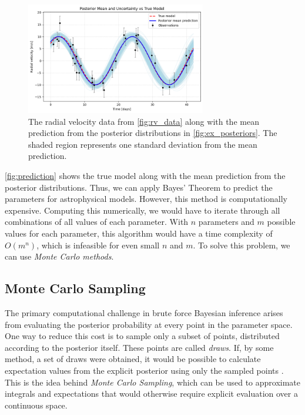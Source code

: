 \documentclass[preprint,longauthor]{aastex631}
\numberwithin{equation}{section}
\begin{document}
\begin{figure}[ht!]
\centering
\includegraphics[width=0.7\textwidth]{../scripts/2.2/figures/prediction.png}
\caption{The radial velocity data from \autoref{fig:rv_data} along with the mean prediction from the posterior distributions in \autoref{fig:ex_posteriors}. The shaded region represents one standard deviation from the mean prediction.}
\label{fig:prediction}
\end{figure}

\autoref{fig:prediction} shows the true model along with the mean prediction from the posterior distributions. Thus, we can apply Bayes' Theorem to predict the parameters for astrophysical models. However, this method is computationally expensive. Computing this numerically, we would have to iterate through all combinations of all values of each parameter. With $n$ parameters and $m$ possible values for each parameter, this algorithm would have a time complexity of $O(m^n)$, which is infeasible for even small $n$ and $m$. To solve this problem, we can use \textit{Monte Carlo methods}.

\subsection{Monte Carlo Sampling}
The primary computational challenge in brute force Bayesian inference arises from evaluating the posterior probability at every point in the parameter space. One way to reduce this cost is to sample only a subset of points, distributed according to the posterior itself. These points are called \textit{draws}. If, by some method, a set of draws were obtained, it would be possible to calculate expectation values from the explicit posterior using only the sampled points \citep{vontoussaintBayesianInferencePhysics2011}. This is the idea behind \textit{Monte Carlo Sampling}, which can be used to approximate integrals and expectations that would otherwise require explicit evaluation over a continuous space.
\end{document}
